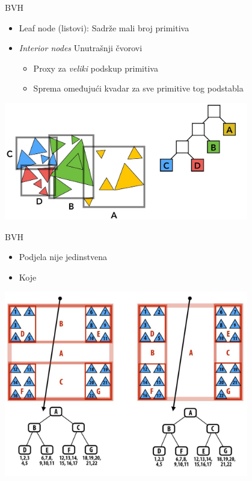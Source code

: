 \documentclass[9pt]{beamer}
\begin{document}
\begin{frame}{BVH}
	\begin{itemize}
		\item Leaf node (listovi): Sadrže mali broj primitiva
		\item \textit{Interior nodes} Unutrašnji čvorovi
		\begin{itemize}
			\item Proxy za \textit{veliki} podskup primitiva
			\item Sprema omeđujući kvadar za sve primitive tog podstabla
		\end{itemize}
	\end{itemize}
	\begin{center}
		\includegraphics[width=0.8\textwidth]{slike/slide_019.jpg}
	\end{center}
\end{frame}

\begin{frame}{BVH}
	\begin{itemize}
		\item Podjela nije jedinstvena
		\item Koje 
	\end{itemize}
	\begin{center}
		\includegraphics[width=0.8\textwidth]{slike/slide_020.jpg}
	\end{center}
\end{frame}
\end{document}
